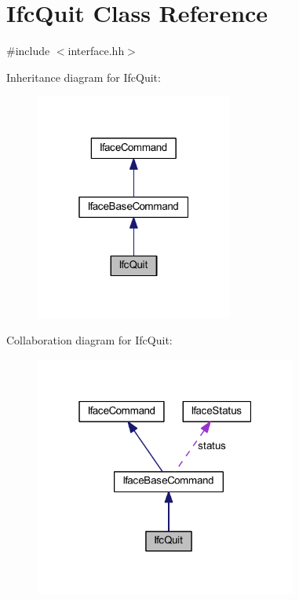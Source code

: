 \hypertarget{class_ifc_quit}{}\section{Ifc\+Quit Class Reference}
\label{class_ifc_quit}


{\ttfamily \#include $<$interface.\+hh$>$}



Inheritance diagram for Ifc\+Quit\+:
\nopagebreak
\begin{figure}[H]
\begin{center}
\leavevmode
\includegraphics[width=184pt]{class_ifc_quit__inherit__graph}
\end{center}
\end{figure}


Collaboration diagram for Ifc\+Quit\+:
\nopagebreak
\begin{figure}[H]
\begin{center}
\leavevmode
\includegraphics[width=244pt]{class_ifc_quit__coll__graph}
\end{center}
\end{figure}
